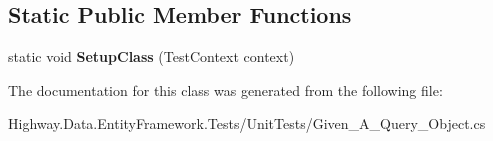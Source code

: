 \subsection*{Static Public Member Functions}
\begin{DoxyCompactItemize}
\item 
\hypertarget{class_highway_1_1_data_1_1_entity_framework_1_1_tests_1_1_unit_tests_1_1_given___a___query___object_a2e29d7caced0ff583dc0650b4fa0a7d1}{static void {\bfseries Setup\-Class} (Test\-Context context)}\label{class_highway_1_1_data_1_1_entity_framework_1_1_tests_1_1_unit_tests_1_1_given___a___query___object_a2e29d7caced0ff583dc0650b4fa0a7d1}

\end{DoxyCompactItemize}


The documentation for this class was generated from the following file\-:\begin{DoxyCompactItemize}
\item 
Highway.\-Data.\-Entity\-Framework.\-Tests/\-Unit\-Tests/Given\-\_\-\-A\-\_\-\-Query\-\_\-\-Object.\-cs\end{DoxyCompactItemize}
